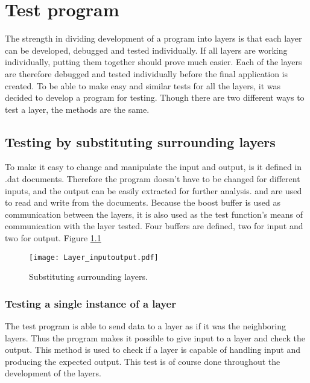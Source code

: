 
\chapter{Test program}\label{chap:test}


The strength in dividing development of a program into layers is that each layer can be developed, debugged and tested individually. If all layers are working individually, putting them together should prove much easier. Each of the layers are therefore debugged and tested individually before the final application is created. To be able to make easy and similar tests for all the layers, it was decided to develop a program for testing. Though there are two different ways to test a layer, the methods are the same.

\section{Testing by substituting surrounding layers}
To make it easy to change and manipulate the input and output, is it defined in .dat documents. Therefore the program doesn't have to be changed for different inputs, and the output can be easily extracted for further analysis.  and  are used to read and write from the documents. 
Because the boost buffer is used as communication between the layers, it is also used as the test function's means of communication with the layer tested. Four buffers  are defined, two for input and two for output.
Figure \ref{fig:Layer_inputoutput}

\begin{figure}[htb]
	\begin{center}
	\texttt{[image: Layer\_inputoutput.pdf]}
	\caption{Substituting surrounding layers.}
	\label{fig:Layer_inputoutput}	
	\end{center}
\end{figure}

\subsection{Testing a single instance of a layer}  

 The test program is able to send data to a layer as if it was the neighboring layers. Thus the program makes it possible to give input to a layer and check the output. This method is used to check if a layer is capable of  handling input and producing the expected output. This test is of course done throughout the development of the layers.


